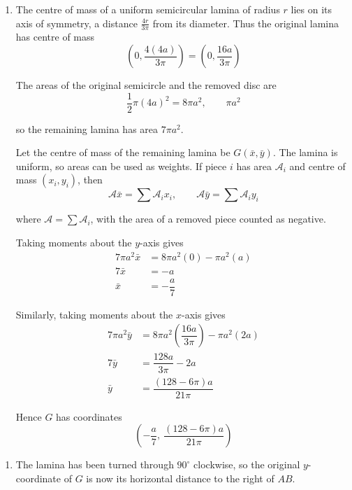 \documentclass[leqno]{article}
\begin{document}
\begin{enumerate}[
  label=\textbf{\arabic*.},
  leftmargin=*,
  topsep=0pt,
  partopsep=0pt,
  parsep=0pt
]
\vspace*{10pt}

\begin{djsSolution}
\begin{enumerate}[label=\textbf{(\alph*)}, start=1]
\item
The centre of mass of a uniform semicircular lamina of radius \(r\) lies on its axis of symmetry, a distance \(\frac{4r}{3\pi}\) from its diameter. Thus the original lamina has centre of mass
\[
\left(0,\dfrac{4(4a)}{3\pi}\right)=\left(0,\dfrac{16a}{3\pi}\right)
\]

The areas of the original semicircle and the removed disc are
\[
\dfrac12\pi(4a)^2=8\pi a^2,
\qquad \pi a^2
\]

so the remaining lamina has area \(7\pi a^2\).

Let the centre of mass of the remaining lamina be \(G(\bar{x},\bar{y})\). The lamina is uniform, so areas can be used as weights. If piece \(i\) has area \(\mathcal{A}_i\) and centre of mass \((x_i,y_i)\), then
\[
\mathcal{A}\bar{x}=\sum\mathcal{A}_ix_i,\qquad \mathcal{A}\bar{y}=\sum\mathcal{A}_iy_i
\]

where \(\mathcal{A}=\sum\mathcal{A}_i\), with the area of a removed piece counted as negative.

Taking moments about the \(y\)-axis gives
\begin{align*}
7\pi a^2\bar{x}&=8\pi a^2(0)-\pi a^2(a)\\
7\bar{x}&=-a\\
\bar{x}&=-\dfrac{a}{7}
\end{align*}

Similarly, taking moments about the \(x\)-axis gives
\begin{align*}
7\pi a^2\bar{y}&=8\pi a^2\left(\dfrac{16a}{3\pi}\right)-\pi a^2(2a)\\
7\bar{y}&=\dfrac{128a}{3\pi}-2a\\
\bar{y}&=\dfrac{(128-6\pi)a}{21\pi}
\end{align*}

Hence \(G\) has coordinates
\[
\left(-\dfrac{a}{7},\ \dfrac{(128-6\pi)a}{21\pi}\right)
\]

\end{enumerate}
\begin{enumerate}[label=\textbf{(\alph*)}, start=2]
\item
The lamina has been turned through \(90^\circ\) clockwise, so the original \(y\)-coordinate of \(G\) is now its horizontal distance to the right of \(AB\).


\end{enumerate}
\end{djsSolution}
\end{enumerate}
\end{document}
